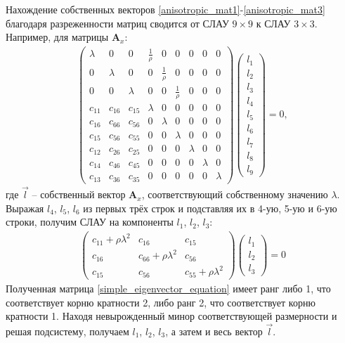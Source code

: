 Нахождение собственных векторов \eqref{anisotropic_mat1}-\eqref{anisotropic_mat3} благодаря разреженности матриц сводится от СЛАУ $9\times9$ к СЛАУ $3\times3$.
Например, для матрицы $\mathbf{A}_x$:
\begin{align}
\label{eigenvector_equation}
\left( \begin{array}{cccccccccccc}
\lambda & 0 & 0 & \frac 1 \rho & 0 & 0 & 0 & 0 & 0 \\ 
0 & \lambda & 0 & 0 & \frac 1 \rho & 0 & 0 & 0 & 0 \\ 
0 & 0 & \lambda & 0 & 0 & \frac 1 \rho & 0 & 0 & 0 \\ 
c_{11} & c_{16} & c_{15} & \lambda & 0 & 0 & 0 & 0 & 0 \\ 
c_{16} & c_{66} & c_{56} & 0 & \lambda & 0 & 0 & 0 & 0 \\
c_{15} & c_{56} & c_{55} & 0 & 0 & \lambda & 0 & 0 & 0 \\ 
c_{12} & c_{26} & c_{25} & 0 & 0 & 0 & \lambda & 0 & 0 \\ 
c_{14} & c_{46} & c_{45} & 0 & 0 & 0 & 0 & \lambda & 0 \\ 
c_{13} & c_{36} & c_{35} & 0 & 0 & 0 & 0 & 0 & \lambda
\end{array} \right){}
\left( \begin{array}{cccccccccccc}
l_1 \\
l_2 \\
l_3 \\
l_4 \\
l_5 \\
l_6 \\
l_7 \\
l_8 \\
l_9
\end{array} \right){}
 = 0,
\end{align}
где $\vec{l}$ -- собственный вектор $\mathbf{A}_x$, соответствующий собственному значению $\lambda$.
Выражая $l_4$, $l_5$, $l_6$ из первых трёх строк и подставляя их в 4-ую, 5-ую и 6-ую строки, получим СЛАУ на компоненты $l_1$, $l_2$, $l_3$:
\begin{align}
\label{simple_eigenvector_equation}
\left( \begin{array}{cccccccccccc}
c_{11} + \rho\lambda^{2} & c_{16} & c_{15} \\ 
c_{16} & c_{66} + \rho\lambda^{2} & c_{56} \\ 
c_{15} & c_{56} & c_{55} + \rho\lambda^{2} 
\end{array} \right){}
\left( \begin{array}{cccccccccccc}
l_1 \\
l_2 \\
l_3
\end{array} \right){}
 = 0
\end{align}
Полученная матрица \eqref{simple_eigenvector_equation} имеет ранг либо 1, что соответствует корню кратности 2, либо ранг 2, что соответствует корню кратности 1.
Находя невырожденный минор соответствующей размерности и решая подсистему, получаем $l_1$, $l_2$, $l_3$, а затем и весь вектор $\vec{l}$.


